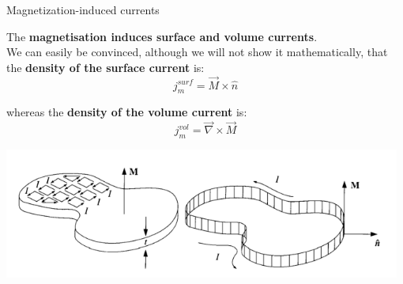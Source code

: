 %
%
%

\begin{frame}{Magnetization-induced currents}

The {\bf magnetisation induces surface and volume currents}.\\
\vspace{0.3cm}
We can easily be convinced, although we will not show it mathematically,
that the {\bf density of the surface current} is:
\begin{equation*}
  j_{m}^{surf} = \vec{M} \times \hat{n}
\end{equation*}

\vspace{0.1cm}

whereas the {\bf density of the volume current} is:
\begin{equation*}
  j_{m}^{vol} = \vec{\nabla} \times \vec{M}
\end{equation*}

\begin{center}
  \includegraphics[width=0.98\textwidth]{./images/schematics/magnetization_currents_01.png}\\
\end{center}

\end{frame}


%
%
%

